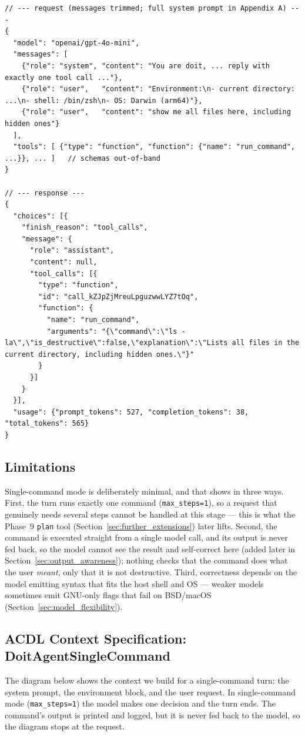 \documentclass[11pt,a4paper]{article}
\begin{document}
\begin{lstlisting}[numbers=none, basicstyle=\ttfamily\scriptsize, breaklines=true, caption={Trimmed raw request/response for \texttt{doit "show me all files here, including hidden ones"} (\texttt{openai/gpt-4o-mini}).}]
// --- request (messages trimmed; full system prompt in Appendix A) ---
{
  "model": "openai/gpt-4o-mini",
  "messages": [
    {"role": "system", "content": "You are doit, ... reply with exactly one tool call ..."},
    {"role": "user",   "content": "Environment:\n- current directory: ...\n- shell: /bin/zsh\n- OS: Darwin (arm64)"},
    {"role": "user",   "content": "show me all files here, including hidden ones"}
  ],
  "tools": [ {"type": "function", "function": {"name": "run_command", ...}}, ... ]   // schemas out-of-band
}

// --- response ---
{
  "choices": [{
    "finish_reason": "tool_calls",
    "message": {
      "role": "assistant",
      "content": null,
      "tool_calls": [{
        "type": "function",
        "id": "call_kZJpZjMreuLpguzwwLYZ7tOq",
        "function": {
          "name": "run_command",
          "arguments": "{\"command\":\"ls -la\",\"is_destructive\":false,\"explanation\":\"Lists all files in the current directory, including hidden ones.\"}"
        }
      }]
    }
  }],
  "usage": {"prompt_tokens": 527, "completion_tokens": 38, "total_tokens": 565}
}
\end{lstlisting}

\subsection{Limitations}
Single-command mode is deliberately minimal, and that shows in three ways. First, the turn runs exactly one command (\texttt{max\_steps=1}), so a request that genuinely needs several steps cannot be handled at this stage --- this is what the Phase~9 \texttt{plan} tool (Section~\ref{sec:further_extensions}) later lifts. Second, the command is executed straight from a single model call, and its output is never fed back, so the model cannot see the result and self-correct here (added later in Section~\ref{sec:output_awareness}); nothing checks that the command does what the user \emph{meant}, only that it is not destructive. Third, correctness depends on the model emitting syntax that fits the host shell and OS --- weaker models sometimes emit GNU-only flags that fail on BSD/macOS (Section~\ref{sec:model_flexibility}).

\subsection{ACDL Context Specification: DoitAgentSingleCommand}
The diagram below shows the context we build for a single-command turn: the system prompt, the environment block, and the user request. In single-command mode (\texttt{max\_steps=1}) the model makes one decision and the turn ends. The command's output is printed and logged, but it is never fed back to the model, so the diagram stops at the request.
\end{document}
